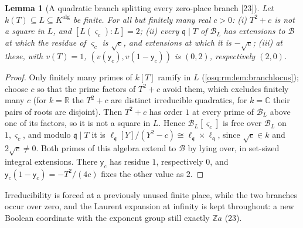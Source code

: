 \documentclass[11pt,letterpaper]{article}
\numberwithin{equation}{section}
\newtheorem{lemma}[lemma]{Lemma}
\theoremstyle{definition}
\theoremstyle{remark}
\theoremstyle{plain}
\newcommand{\Z}{\mathbb Z}
\newcommand{\R}{\mathbb R}
\newcommand{\C}{\mathbb C}
\newcommand{\src}[1]{\textup{\textsf{[#1]}}}
\begin{document}
\begin{lemma}[A quadratic branch splitting every zero-place branch \src{23}]\label{osq:rm:lem:freshquad}
Let $k(T)\subseteq L\subseteq K^{\mathrm{alg}}$ be finite. For all but finitely many real $c>0$: (i) $T^2+c$ is not a square in $L$, and $[L(\varsigma_c):L]=2$;
(ii) every $\mathfrak q\mid T$ of $\mathscr B_L$ has extensions to $\mathscr B$ at which the residue of $\varsigma_c$ is $\sqrt c$, and extensions at which it is
$-\sqrt c$; (iii) at these, with $v(T)=1$, $(v(\mathsf y_c),v(1-\mathsf y_c))$ is $(0,2)$, respectively $(2,0)$.
\end{lemma}
\begin{proof}
Only finitely many primes of $k[T]$ ramify in $L$ (\cref{osq:rm:lem:branchlocus}); choose $c$ so that the prime factors of $T^2+c$ avoid them, which
excludes finitely many $c$ (for $k=\R$ the $T^2+c$ are distinct irreducible quadratics, for $k=\C$ their pairs of roots are disjoint). Then $T^2+c$ has
order $1$ at every prime of $\mathscr B_L$ above one of its factors, so it is not a square in $L$. Hence $\mathscr B_L[\varsigma_c]$ is free over $\mathscr B_L$ on $1,\varsigma_c$,
and modulo $\mathfrak q\mid T$ it is $\ell_{\mathfrak q}[Y]/(Y^2-c)\cong\ell_{\mathfrak q}\times\ell_{\mathfrak q}$, since $\sqrt c\in k$ and $2\sqrt c\ne0$. Both primes of this
algebra extend to $\mathscr B$ by lying over, in set-sized integral extensions. There $\mathsf y_c$ has residue $1$, respectively $0$, and
$\mathsf y_c(1-\mathsf y_c)=-T^2/(4c)$ fixes the other value as $2$.
\end{proof}

Irreducibility is forced at a previously unused finite place, while the two branches occur over zero, and the Laurent expansion at infinity is kept
throughout: a new Boolean coordinate with the exponent group still exactly $\Z a$ (23).
\end{document}
